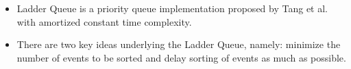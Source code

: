 \documentclass[table]{beamer}
\begin{document}
\begin{frame}
\begin{figure}
\begin{minipage}{0.45\textwidth}
\end{minipage}
\end{figure}
\begin{itemize}
\item Ladder Queue is a priority queue implementation proposed by Tang et al. with amortized constant time complexity.
\item There are two key ideas underlying the Ladder Queue, namely: minimize the number of events to be sorted and delay sorting of events as much as possible.
\end{itemize}
\end{frame}

\end{document}
